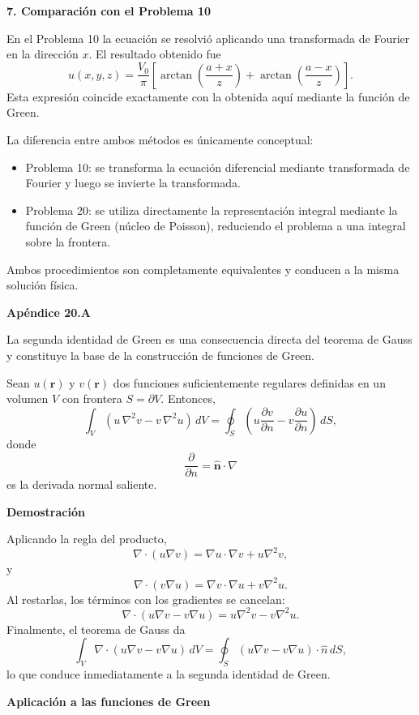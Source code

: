 \documentclass[11pt,spanish]{article}
\newcounter{problema}
\begin{document}
{\bf 7. Comparación con el Problema 10}

En el Problema 10 la ecuación se resolvió aplicando una transformada de Fourier en la dirección $x$.
El resultado obtenido fue 
$$
u(x,y,z)
=
\frac{V_0}{\pi}
\left[
\arctan\left(\frac{a+x}{z}\right)
+
\arctan\left(\frac{a-x}{z}\right)
\right].
$$
Esta expresión coincide exactamente con la obtenida aquí mediante la función de Green.

La diferencia entre ambos métodos es únicamente conceptual:
\begin{itemize}
\item Problema 10: se transforma la ecuación diferencial mediante transformada de Fourier y luego se invierte la transformada.
\item Problema 20: se utiliza directamente la representación integral mediante la función de Green (núcleo de Poisson), reduciendo el problema a una integral sobre la frontera.
\end{itemize}

Ambos procedimientos son completamente equivalentes y conducen a la misma solución física.

{\bf Ap\'endice 20.A}

La segunda identidad de Green es una consecuencia directa del teorema de Gauss y constituye la base de la construcción de funciones de Green.

Sean $u(\mathbf r)$ y $v(\mathbf r)$ dos funciones suficientemente regulares definidas en un volumen $V$ con frontera $S=\partial V$.
Entonces,
$$
\boxed{
\int_V
\left(
u\,\nabla^2v
-
v\,\nabla^2u
\right)\,dV
=
\oint_S
\left(
u\frac{\partial v}{\partial n}
-
v\frac{\partial u}{\partial n}
\right)\,dS,
}
$$
donde
$$
\frac{\partial}{\partial n}
=
\hat{\mathbf n}\cdot\nabla
$$
es la derivada normal saliente.

{\bf Demostración}

Aplicando la regla del producto,
$$
\nabla\cdot(u\nabla v)
=
\nabla u\cdot\nabla v
+
u\nabla^2v,
$$
y
$$
\nabla\cdot(v\nabla u)
=
\nabla v\cdot\nabla u
+
v\nabla^2u.
$$
Al restarlas, los términos con los gradientes se cancelan:
$$
\nabla\cdot
(u\nabla v-v\nabla u)
=
u\nabla^2v
-
v\nabla^2u.
$$
Finalmente, el teorema de Gauss da
$$
\int_V
\nabla\cdot
(u\nabla v-v\nabla u)\,dV
=
\oint_S
(u\nabla v-v\nabla u)\cdot\hat n\,dS,
$$
lo que conduce inmediatamente a la segunda identidad de Green.

{\bf Aplicación a las funciones de Green}
\end{document}
